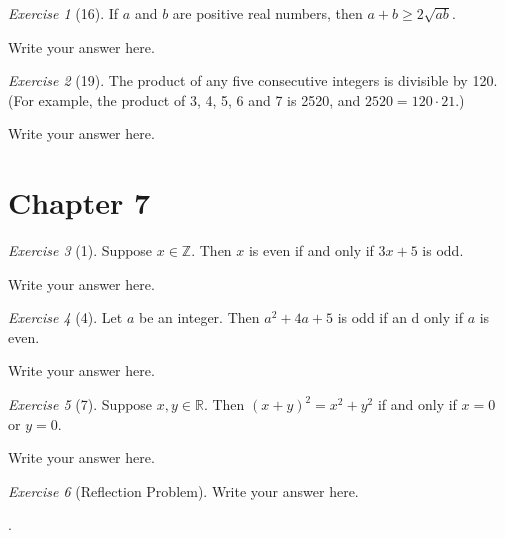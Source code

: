\documentclass[12pt]{amsart}
\makeatletter
\theoremstyle{remark}
\newtheorem*{exercise}{Exercise}%
\def\RR{\ensuremath{\mathbb R}}
\def\ZZ{\ensuremath{\mathbb Z}}
\renewenvironment{proof}[1][\proofname]{\par\doublespacing
  \pushQED{\qed}%
  \normalfont \topsep6\p@\@plus6\p@\relax
  \list{}{%
    \settowidth{\leftmargin}{\itshape\proofname:\hskip\labelsep}%
    \setlength{\labelwidth}{0pt}%
    \setlength{\itemindent}{-\leftmargin}%
  }%
  \item[\hskip\labelsep\itshape#1\@addpunct{:}]\ignorespaces
}{%
  \popQED\endlist\@endpefalse
  \singlespacing
}
\theoremstyle{mycomment}
\makeatother
\begin{document}
\begin{exercise}[16] If $a$ and $b$ are positive real numbers, then $a+b\ge 2\sqrt{ab}$.
\begin{proof}
Write your answer here.
\end{proof}
\end{exercise}

\begin{exercise}[19] The product of any five consecutive integers is divisible by 120. (For example, the product of 3, 4, 5, 6 and 7 is 2520, and $2520=120\cdot 21$.)
\begin{proof}
Write your answer here.
\end{proof}
\end{exercise}

\section*{Chapter 7}
\begin{exercise}[1] Suppose $x\in\ZZ$. Then $x$ is even if and only if $3x+5$ is odd.
\begin{proof}
Write your answer here.
\end{proof}
\end{exercise}
\begin{exercise}[4] Let $a$ be an integer. Then $a^{2}+4a+5$ is odd if an d only if $a$ is even.
\begin{proof}
Write your answer here.
\end{proof}
\end{exercise}
\begin{exercise}[7] Suppose $x,y\in\RR$. Then $(x+y)^{2}=x^{2}+y^{2}$ if and only if $x=0$ or $y=0$.
\begin{proof}
Write your answer here.
\end{proof}
\end{exercise}

\begin{exercise}[Reflection Problem]
\begin{proof}
Write your answer here.
\end{proof}
\end{exercise}.















 
\end{document}
